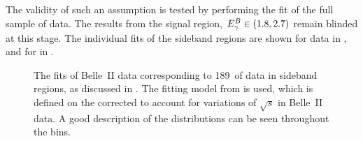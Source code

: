 The validity of such an assumption is tested by performing the \Mbc fit of the full sample of data. 
The results from the signal region, ${E^B_{\gamma}}\in(1.8,2.7)$ remain blinded at this stage.
The individual \Mbc fits of the \EB sideband regions are shown for data in , and for \MC in .
\begin{figure}[hbtp!]
    \centering
    \caption{\label{fig:sideband_data_fit}    
    The \Mbc fits of Belle~II data corresponding to 189~\invfb of data in \EB sideband regions,
    as discussed in .
    The fitting model from  is used,
    which is defined on the corrected \Mbc to account for variations of $\sqrt{s}$ in Belle~II data.
    A good description of the \Mbc distributions can be seen throughout the \EB bins.
    }
\end{figure}
